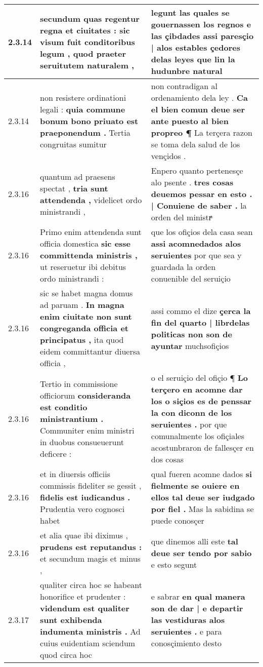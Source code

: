\begin{tabular}{|p{1cm}|p{6.5cm}|p{6.5cm}|}
2.3.14 & secundum quas regentur regna et ciuitates : \textbf{ sic visum fuit conditoribus legum , } quod praeter seruitutem naturalem , & legunt las quales se gouernassen los regnos e las çibdades \textbf{ assi paresçio | alos estables çedores delas leyes } que lin la hudunbre natural \\\hline
2.3.14 & non resistere ordinationi legali : \textbf{ quia commune bonum bono priuato est praeponendum . } Tertia congruitas sumitur & non contradigan al ordenamiento dela ley . \textbf{ Ca el bien comun deue ser ante puesto al bien propreo ¶ } La terçera razon se toma dela salud de los vençidos . \\\hline
2.3.16 & quantum ad praesens spectat , \textbf{ tria sunt attendenda , } videlicet ordo ministrandi , & Enpero quanto pertenesçe alo psente . \textbf{ tres cosas deuemos pessar en esto . | Conuiene de saber . } la orden del ministrͣ \\\hline
2.3.16 & Primo enim attendenda sunt officia domestica \textbf{ sic esse committenda ministris , } ut reseruetur ibi debitus ordo ministrandi : & que los ofiçios dela casa sean \textbf{ assi acomnedados alos seruientes } por que sea y guardada la orden conuenible del seruiçio \\\hline
2.3.16 & sic se habet magna domus ad paruam . \textbf{ In magna enim ciuitate non sunt congreganda officia et principatus , } ita quod eidem committantur diuersa officia , & assi commo el dize \textbf{ çerca la fin del quarto | librdelas politicas non son de ayuntar } muchsofiçios \\\hline
2.3.16 & Tertio in commissione officiorum \textbf{ consideranda est conditio ministrantium . } Communiter enim ministri in duobus consueuerunt deficere : & o el seruiçio del ofiçio ¶ \textbf{ Lo terçero en acomne dar los o siçios es de penssar la con diconn de los seruientes . } por que comunalmente los ofiçiales acostunbraron de fallesçer en dos cosas \\\hline
2.3.16 & et in diuersis officiis commissis fideliter se gessit , \textbf{ fidelis est iudicandus . } Prudentia vero cognosci habet & qual fueren acomne dados \textbf{ si fielmente se ouiere en ellos tal deue ser iudgado por fiel . } Mas la sabidina se puede conosçer \\\hline
2.3.16 & et alia quae ibi diximus , \textbf{ prudens est reputandus : } et secundum magis et minus , & que dinemos alli este \textbf{ tal deue ser tendo por sabio } e esto segunt \\\hline
2.3.17 & qualiter circa hoc se habeant honorifice et prudenter : \textbf{ videndum est qualiter sunt exhibenda indumenta ministris . } Ad cuius euidentiam sciendum quod circa hoc & e sabrar \textbf{ en qual manera son de dar | e departir las vestiduras alos seruientes . } e para conosçimiento desto \\\hline

\end{tabular}
